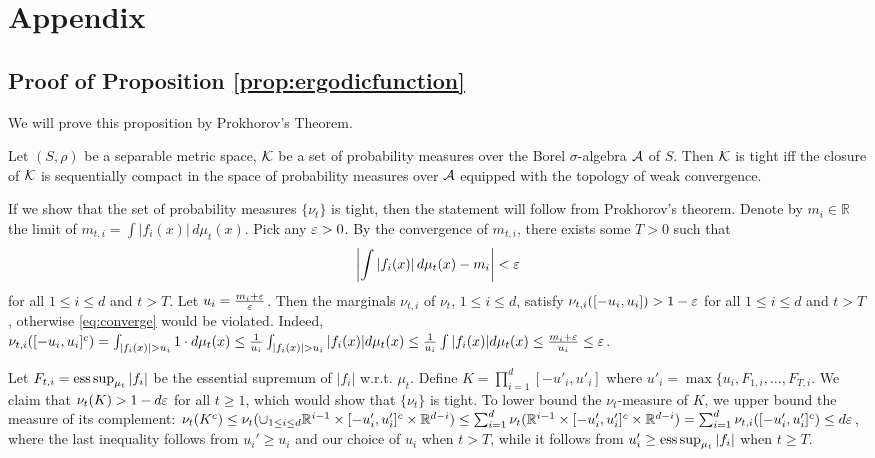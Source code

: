 \onecolumn

\section{Appendix}
\label{sec:Appendix}

\subsection{Proof of Proposition \ref{prop:ergodicfunction}}
We will prove this proposition by Prokhorov's Theorem. 
\begin{thm}
Let $(S,\rho)$ be a separable metric space, $\KK$ be a set of probability measures over the Borel $\sigma$-algebra $\AA$ of $S$.
Then $\KK$ is tight iff the closure of $\KK$ is sequentially compact in the space of probability measures over $\AA$ equipped with the topology of weak convergence.
\end{thm}
If we show that the set of probability measures $\{\nu_t\}$ is tight, then the statement will follow from Prokhorov's theorem.
Denote by $m_i\in \mathbb{R}$ the limit of $ m_{t,i} = \int |f_i(x)|\, d\mu_t(x)$.
Pick any $\eps>0$.
By the convergence of $m_{t,i}$, there exists some $T>0$ such that
\begin{equation}
\label{eq:converge}
\left| \int |f_i(x)|\, d\mu_t (x)- m_i \right| <\eps
\end{equation}
for all $1 \le i \le d$ and $t>T$. Let $u_{i}=\tfrac{m_i+\eps}{\eps}$. Then the marginals
$\nu_{t,i}$ of $\nu_t$, $1\le i \le d$, satisfy $\nu_{t,i}([-u_{i},u_{i}]) > 1-\eps$ for all $1\le i\le d$ and $t>T$, otherwise \eqref{eq:converge} would be violated. 
Indeed, $\nu_{t,i}([-u_i,u_i]^c)=\int_{|f_i(x)|>u_i} 1\cdot d\mu_t(x)
\le \frac{1}{u_i}\int_{|f_i(x)|>u_i} |f_i(x)| d\mu_t(x)
\le \frac{1}{u_i} \int |f_i(x)| d\mu_t(x) \le \frac{m_i+\eps}{u_i}\le \eps$.

Let $F_{t,i} = \esssup_{\mu_t} |f_i|$ be the essential supremum of $|f_i|$ w.r.t. $\mu_t$.
Define 
$K=\prod_{i=1}^d [-u'_{i},u'_{i}]$ where $u'_{i}=\max\{u_{i},F_{1,i}, \ldots,F_{T,i}$.
We claim that 
$\nu_t(K)>1-d \eps$ for all $t \ge 1$, which would show that $\{\nu_t\}$ is tight.
To lower bound the $\nu_t$-measure of $K$, we upper bound the measure of its complement:
$\nu_t(K^c) \le \nu_t( \cup_{1\le i \le d} \real^{i-1} \times [-u_i',u_i']^c \times \real^{d-i})
\le \sum_{i=1}^d \nu_t( \real^{i-1} \times [-u_i',u_i']^c \times \real^{d-i})
=   \sum_{i=1}^d \nu_{t,i}( [-u_i',u_i']^c )
\le d \eps$, where the last inequality follows from $u_i'\ge u_i$ and our choice of $u_i$ when $t>T$,
while it follows from $u_i'\ge \esssup_{\mu_t} |f_i|$ when $t\ge T$.

